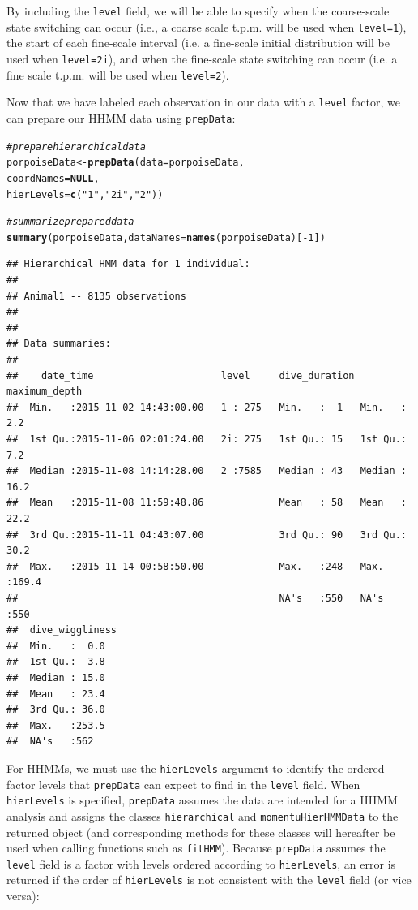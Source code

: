 \documentclass[12pt]{article}\usepackage[]{graphicx}\usepackage[]{xcolor}
\makeatletter
\newcommand{\hlnum}[1]{\textcolor[rgb]{0.686,0.059,0.569}{#1}}%
\newcommand{\hlsng}[1]{\textcolor[rgb]{0.192,0.494,0.8}{#1}}%
\newcommand{\hlcom}[1]{\textcolor[rgb]{0.678,0.584,0.686}{\textit{#1}}}%
\newcommand{\hlopt}[1]{\textcolor[rgb]{0,0,0}{#1}}%
\newcommand{\hldef}[1]{\textcolor[rgb]{0.345,0.345,0.345}{#1}}%
\newcommand{\hlkwa}[1]{\textcolor[rgb]{0.161,0.373,0.58}{\textbf{#1}}}%
\newcommand{\hlkwb}[1]{\textcolor[rgb]{0.69,0.353,0.396}{#1}}%
\newcommand{\hlkwc}[1]{\textcolor[rgb]{0.333,0.667,0.333}{#1}}%
\newcommand{\hlkwd}[1]{\textcolor[rgb]{0.737,0.353,0.396}{\textbf{#1}}}%
\newenvironment{kframe}{%
 \def\at@end@of@kframe{}%
 \ifinner\ifhmode%
  \def\at@end@of@kframe{\end{minipage}}%
  \begin{minipage}{\columnwidth}%
 \fi\fi%
 \def\FrameCommand##1{\hskip\@totalleftmargin \hskip-\fboxsep
 \colorbox{shadecolor}{##1}\hskip-\fboxsep
     \hskip-\linewidth \hskip-\@totalleftmargin \hskip\columnwidth}%
 \MakeFramed {\advance\hsize-\width
   \@totalleftmargin\z@ \linewidth\hsize
   \@setminipage}}%
 {\par\unskip\endMakeFramed%
 \at@end@of@kframe}
\newenvironment{knitrout}{}{} %
\makeatother
\begin{document}
\noindent By including the \verb|level| field, we will be able to specify when the coarse-scale state switching can occur (i.e., a coarse scale t.p.m. will be used when \verb|level=1|), the start of each fine-scale interval (i.e. a fine-scale initial distribution will be used when \verb|level=2i|), and when the fine-scale state switching can occur (i.e. a fine scale t.p.m. will be used when \verb|level=2|).

Now that we have labeled each observation in our data with a \verb|level| factor, we can prepare our HHMM data using \verb|prepData|:
\begin{knitrout}
\color{fgcolor}\begin{kframe}
\begin{alltt}
\hlcom{# prepare hierarchical data}
\hldef{porpoiseData} \hlkwb{<-} \hlkwd{prepData}\hldef{(}\hlkwc{data} \hldef{= porpoiseData,}
                         \hlkwc{coordNames} \hldef{=} \hlkwa{NULL}\hldef{,}
                         \hlkwc{hierLevels} \hldef{=} \hlkwd{c}\hldef{(}\hlsng{"1"}\hldef{,} \hlsng{"2i"}\hldef{,} \hlsng{"2"}\hldef{))}

\hlcom{# summarize prepared data}
\hlkwd{summary}\hldef{(porpoiseData,} \hlkwc{dataNames} \hldef{=} \hlkwd{names}\hldef{(porpoiseData)[}\hlopt{-}\hlnum{1}\hldef{])}
\end{alltt}
\begin{verbatim}
## Hierarchical HMM data for 1 individual:
## 
## Animal1 -- 8135 observations
## 
## 
## Data summaries:
## 
##    date_time                      level     dive_duration maximum_depth  
##  Min.   :2015-11-02 14:43:00.00   1 : 275   Min.   :  1   Min.   :  2.2  
##  1st Qu.:2015-11-06 02:01:24.00   2i: 275   1st Qu.: 15   1st Qu.:  7.2  
##  Median :2015-11-08 14:14:28.00   2 :7585   Median : 43   Median : 16.2  
##  Mean   :2015-11-08 11:59:48.86             Mean   : 58   Mean   : 22.2  
##  3rd Qu.:2015-11-11 04:43:07.00             3rd Qu.: 90   3rd Qu.: 30.2  
##  Max.   :2015-11-14 00:58:50.00             Max.   :248   Max.   :169.4  
##                                             NA's   :550   NA's   :550    
##  dive_wiggliness
##  Min.   :  0.0  
##  1st Qu.:  3.8  
##  Median : 15.0  
##  Mean   : 23.4  
##  3rd Qu.: 36.0  
##  Max.   :253.5  
##  NA's   :562
\end{verbatim}
\end{kframe}
\end{knitrout}
\noindent For HHMMs, we must use the \verb|hierLevels| argument to identify the ordered factor levels that \verb|prepData| can expect to find in the \verb|level| field. When \verb|hierLevels| is specified, \verb|prepData| assumes the data are intended for a HHMM analysis and assigns the classes \verb|hierarchical| and \verb|momentuHierHMMData| to the returned object (and corresponding methods for these classes will hereafter be used when calling functions such as \verb|fitHMM|). Because \verb|prepData| assumes the \verb|level| field is a factor with levels ordered according to \verb|hierLevels|, an error is returned if the order of \verb|hierLevels| is not consistent with the \verb|level| field (or vice versa): 
\end{document}

